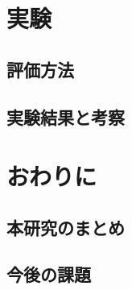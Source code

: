 \documentclass[10pt]{jbook}
\begin{document}
\chapter{実験}
\section{評価方法}
\section{実験結果と考察}
\chapter{おわりに}
\section{本研究のまとめ}
\section{今後の課題}
\end{document}
